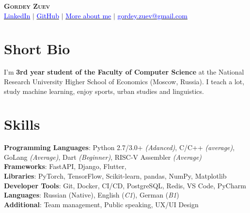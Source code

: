 \documentclass[letterpaper,11pt]{article}
\begin{document}
\begin{center}
    \textsc{\Huge{\textbf{Gordey Zuev}}} \\ \vspace{1pt}
    \href{{https://www.linkedin.com/in/gordey-zuev/}}{\textcolor{blue}{LinkedIn}} $|$
    \href{https://github.com/GordeyZuev}{\textcolor{blue}{GitHub}} $|$
    \href{http://gordeyzuev.notion.site}{\textcolor{blue}{More about me}} $|$
    \href{mailto:gordey.zuev@gmail.com}{\textcolor{blue}{gordey.zuev@gmail.com}}
\end{center}


\section{Short Bio}
 \begin{itemize}[leftmargin=0.15in, label={}]
    \small{\item{
     {I'm \textbf{3rd year student of the Faculty of Computer Science} at the National Research University Higher School of Economics (Moscow, Russia). I teach a lot, study machine learning, enjoy sports, urban studies and linguistics.}
    }}
 \end{itemize}


\section{Skills}
 \begin{itemize}[leftmargin=0.15in, label={}]
    \small{\item{
     \textbf{Programming Languages}{: Python 2.7/3.0+ \textit{(Adanced)}, C/C++ \textit{(average)}, GoLang \textit{(Average)}, Dart \textit{(Beginner)}, RISC-V Assembler \textit{(Average)}} \\
     \textbf{Frameworks}{: FastAPI, Django, Flutter,} \\
     \textbf{Libraries}{: PyTorch, TensorFlow, Scikit-learn, pandas, NumPy, Matplotlib} \\
     \textbf{Developer Tools}{: Git, Docker, CI/CD, PostgreSQL, Redis, VS Code, PyCharm} \\
     \textbf{Languages}{: Russian (Native), English (\textit{C1}), German (\textit{B1})} \\
     \textbf{Additional}{: Team management, Public speaking, UX/UI Design} \\
    }}
 \end{itemize}
\end{document}
